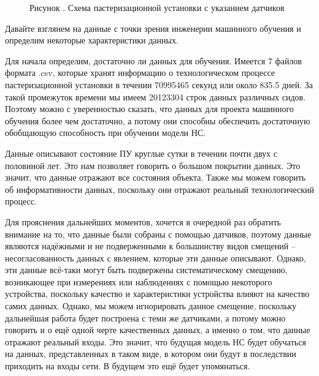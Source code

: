 {  \begin{figure}
    \centering
    \def\svgwidth{\textwidth}
    
    \caption*{\gostFont Рисунок \thechaptercntr .\theimagecntr \spc {--} Схема пастеризационной установки с указанием датчиков}
    \label{fig:NNBlackBox}
  \end{figure} \addtocounter{imagecntr}{1} \addtocounter{tablecntr}{1}

  \par \redline Давайте взглянем на данные с точки зрения инженерии машинного обучения и определим некоторые характеристики данных. 

  \par \redline Для начала определим, достаточно ли данных для обучения. Имеется 7 файлов формата .csv, которые хранят информацию о технологическом процессе пастеризационной установки в течении 70995465 секунд или около 835.5 дней. За такой промежуток времени мы имеем 20123304 строк данных различных сидов. Поэтому можно с уверенностью сказать, что данных для проекта машинного обучения более чем достаточно, а потому они способны обеспечить достаточную обобщающую способность при обучении модели НС.

  \par \redline Данные описывают состояние ПУ круглые сутки в течении почти двух с половиной лет. Это нам позволяет говорить о большом покрытии данных. Это значит, что данные отражают все состояния объекта. Также мы можем говорить об информативности данных, поскольку они отражают реальный технологический процесс.

  \par \redline Для прояснения дальнейших моментов, хочется в очередной раз обратить внимание на то, что данные были собраны с помощью датчиков, поэтому данные являются надёжными и не подверженными к большинству видов смещений {--} несогласованность данных с явлением, которые эти данные описывают.  Однако, эти данные всё-таки могут быть подвержены систематическому смещению, возникающее при измерениях или наблюдениях с помощью некоторого устройства, поскольку качество и характеристики устройства влияют на качество самих данных. Однако, мы можем игнорировать данное смещение, поскольку дальнейшая работа будет построена с теми же датчиками, а потому можно говорить и о ещё одной черте качественных данных, а именно о том, что данные отражают реальный входы. Это значит, что будущая модель НС будет обучаться на данных, представленных в таком виде, в котором они будут в последствии приходить на входы сети. В будущем это ещё будет упомянаться.

}
